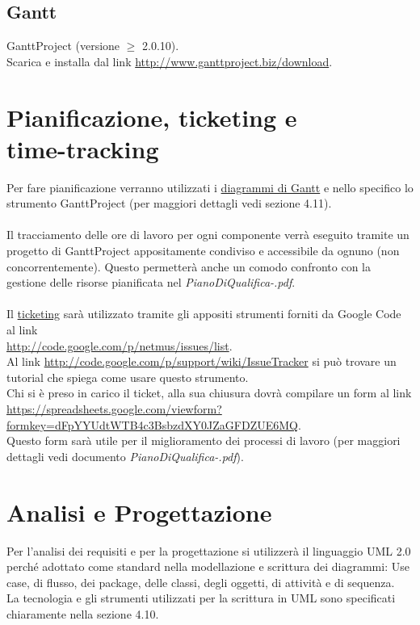 \section{Gantt}
GanttProject (versione $\geq$ 2.0.10). 
\\
Scarica e installa dal link
\url{http://www.ganttproject.biz/download}.


\chapter{Pianificazione, ticketing e \\time-tracking}
\thispagestyle{fancy}
Per fare pianificazione verranno utilizzati i \underline{diagrammi di Gantt} e
nello specifico lo strumento GanttProject (per maggiori dettagli vedi sezione 4.11). 
\\ \\
Il tracciamento delle ore di lavoro per ogni componente verr\`a eseguito
tramite un progetto di GanttProject appositamente condiviso e accessibile da ognuno (non concorrentemente). Questo permetter\`a anche un comodo confronto con la
gestione delle risorse pianificata nel \emph{PianoDiQualifica-\versionePQ.pdf}.
\\ \\
Il \underline{ticketing} sar\`a utilizzato tramite gli appositi strumenti
forniti da Google Code al link
\\\url{http://code.google.com/p/netmus/issues/list}. \\Al link
\url{http://code.google.com/p/support/wiki/IssueTracker} si pu\`o trovare un tutorial che spiega come usare questo strumento.\\
Chi si \`e preso in carico il ticket, alla sua chiusura dovr\`a
compilare un form al link
\url{https://spreadsheets.google.com/viewform?formkey=dFpYYUdtWTB4c3BsbzdXY0JZaGFDZUE6MQ}.
\\Questo form sar\`a utile per il miglioramento dei processi di lavoro (per
maggiori dettagli vedi documento \emph{PianoDiQualifica-\versionePQ.pdf}).


\chapter{Analisi e Progettazione}
\thispagestyle{fancy} 
Per l'analisi dei
requisiti e per la progettazione si utilizzer\`a il linguaggio UML 2.0 perch\'e
adottato come standard nella modellazione e scrittura dei diagrammi: Use case,
di flusso, dei package, delle classi, degli oggetti, di attivit\`a e di sequenza.
\\
La tecnologia e gli strumenti utilizzati per la scrittura in UML
sono specificati chiaramente nella sezione 4.10.

